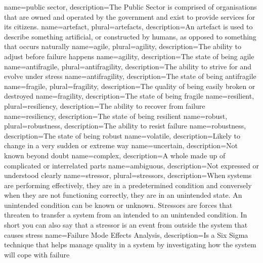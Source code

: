 {
	name={public sector},
	description={The Public Sector is comprised of organisations that are owned and operated by the government and exist to provide services for its citizens.}
}
{
	name={artefact},
	plural={artefacts},
	description={An artefact is used to describe something artificial, or constructed by humans, as opposed to something that occurs naturally}
}
{
	name=agile,
	plural={agility},
	description={The ability to adjust before failure happens}
}
{
	name={agility},
	description={The state of being agile}
}
{
	name={antifragile},
	plural={antifragility},
	description={The ability to strive for and evolve under stress}
}
{
	name={antifragility},
	description={The state of being antifragile}
}
{
	name=fragile,
	plural={fragility},
	description={The quality of being easily broken or destroyed}
}
{
	name={fragility},
	description={The state of being fragile}
}
{
	name=resilient,
	plural={resiliency},
	description={The ability to recover from failure}
}
{
	name={resiliency},
	description={The state of being resilient}
}
{
	name=robust,
	plural={robustness},
	description={The ability to resist failure}
}
{
	name={robustness},
	description={The state of being robust}
}
{
	name=volatile,
	description={Likely to change in a very sudden or extreme way}
}
{
	name=uncertain,
	description={Not known beyond doubt}
}
{
	name=complex,
	description={A whole made up of complicated or interrelated parts}
}
{
	name=ambiguous,
	description={Not expressed or understood clearly}
}
{
	name={stressor},
	plural={stressors},
	description={When systems are performing effectively, they are in a predetermined condition and conversely when they are not functioning correctly, they are in an unintended state. An unintended condition can be known or unknown. Stressors are forces that threaten to transfer a system from an intended to an unintended condition. In short you can also say that a stressor is an event from outside the system that causes stress}
}
{
	name={Failure Mode Effects Analysis},
	description={Is a Six Sigma technique that helps manage quality in a system by investigating how the system will cope with failure}
}
